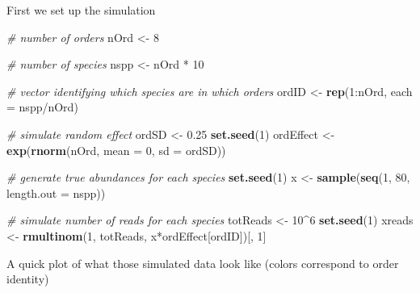 \documentclass[]{article}
\newenvironment{Shaded}{\begin{snugshade}}{\end{snugshade}}
\newcommand{\KeywordTok}[1]{\textcolor[rgb]{0.13,0.29,0.53}{\textbf{{#1}}}}
\newcommand{\DataTypeTok}[1]{\textcolor[rgb]{0.13,0.29,0.53}{{#1}}}
\newcommand{\DecValTok}[1]{\textcolor[rgb]{0.00,0.00,0.81}{{#1}}}
\newcommand{\FloatTok}[1]{\textcolor[rgb]{0.00,0.00,0.81}{{#1}}}
\newcommand{\StringTok}[1]{\textcolor[rgb]{0.31,0.60,0.02}{{#1}}}
\newcommand{\CommentTok}[1]{\textcolor[rgb]{0.56,0.35,0.01}{\textit{{#1}}}}
\newcommand{\NormalTok}[1]{{#1}}
\begin{document}
First we set up the simulation

\begin{Shaded}
\begin{Highlighting}[]
\CommentTok{# number of orders}
\NormalTok{nOrd <-}\StringTok{ }\DecValTok{8}

\CommentTok{# number of species}
\NormalTok{nspp <-}\StringTok{ }\NormalTok{nOrd *}\StringTok{ }\DecValTok{10}

\CommentTok{# vector identifying which species are in which orders}
\NormalTok{ordID <-}\StringTok{ }\KeywordTok{rep}\NormalTok{(}\DecValTok{1}\NormalTok{:nOrd, }\DataTypeTok{each =} \NormalTok{nspp/nOrd)}

\CommentTok{# simulate random effect}
\NormalTok{ordSD <-}\StringTok{ }\FloatTok{0.25}
\KeywordTok{set.seed}\NormalTok{(}\DecValTok{1}\NormalTok{)}
\NormalTok{ordEffect <-}\StringTok{ }\KeywordTok{exp}\NormalTok{(}\KeywordTok{rnorm}\NormalTok{(nOrd, }\DataTypeTok{mean =} \DecValTok{0}\NormalTok{, }\DataTypeTok{sd =} \NormalTok{ordSD))}

\CommentTok{# generate true abundances for each species}
\KeywordTok{set.seed}\NormalTok{(}\DecValTok{1}\NormalTok{)}
\NormalTok{x <-}\StringTok{ }\KeywordTok{sample}\NormalTok{(}\KeywordTok{seq}\NormalTok{(}\DecValTok{1}\NormalTok{, }\DecValTok{80}\NormalTok{, }\DataTypeTok{length.out =} \NormalTok{nspp))}

\CommentTok{# simulate number of reads for each species}
\NormalTok{totReads <-}\StringTok{ }\DecValTok{10}\NormalTok{^}\DecValTok{6}
\KeywordTok{set.seed}\NormalTok{(}\DecValTok{1}\NormalTok{)}
\NormalTok{xreads <-}\StringTok{ }\KeywordTok{rmultinom}\NormalTok{(}\DecValTok{1}\NormalTok{, totReads, x*ordEffect[ordID])[, }\DecValTok{1}\NormalTok{]}
\end{Highlighting}
\end{Shaded}

A quick plot of what those simulated data look like (colors correspond
to order identity)
\end{document}
